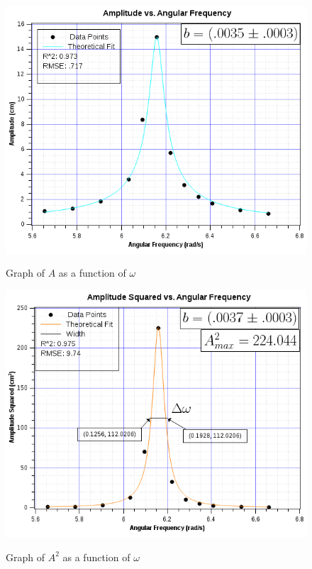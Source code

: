 \documentclass[twocolumn,english]{IEEEtran}
\theoremstyle{plain}
\theoremstyle{plain}
\begin{document}
\begin{figure}[h!]
  \begin{centering}
  \begin{center}
  \includegraphics[width=\linewidth]{./graph_amplitude_vw.png}
  \label{fig:graph_amplitude_vw}
  \caption{Graph of $A$ as a function of $\omega$}
  \end{center}
  \par\end{centering}
\end{figure}

\begin{figure}[h!]
  \begin{centering}
  \begin{center}
  \includegraphics[width=\linewidth]{./graph_amplitude_squared_vw.png}
  \label{fig:graph_amplitude_squared_vw}
  \caption{Graph of $A^2$ as a function of $\omega$}
  \end{center}
  \par\end{centering}
\end{figure}
\end{document}
